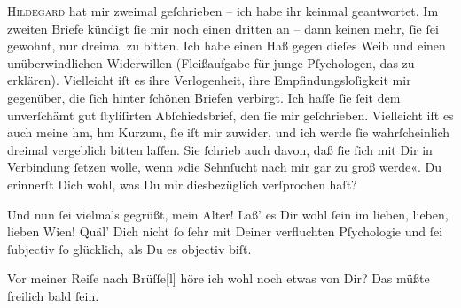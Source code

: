 \pstart
           \textsc{Hildegard} hat mir zweimal geſchrieben –  ich habe
               ihr keinmal geantwortet. Im zweiten Briefe kündigt ſie mir noch einen dritten an –
               dann keinen mehr, ſie ſei gewohnt, nur dreimal zu bitten. Ich habe einen Haß gegen
               dieſes Weib und einen
               unüberwindlichen Widerwillen (Fleißaufgabe für junge Pſychologen, das zu erklären).
                  {\pb}Vielleicht iſt es ihre Verlogenheit, ihre
               Empfindungsloſigkeit mir gegenüber, die ſich hinter ſchönen Briefen verbirgt. Ich
               haſſe ſie ſeit dem unverſchämt gut ſ\textcolor{gray}{t}yliſirten Abſchiedsbrief, den
               ſie mir geſchrieben. Vielleicht iſt es auch meine {\dotsfour} hm, hm
                  {\dotsfour} Kurzum, ſie iſt mir zuwider, und ich werde ſie
               wahrſcheinlich dreimal vergeblich bitten laſſen. Sie ſchrieb auch davon, daß ſie ſich
               mit Dir in Verbindung ſetzen wolle, wenn »die Sehnſucht nach  mir gar zu groß werde«. Du erinnerſt Dich wohl, was Du mir diesbezüglich
               verſprochen haſt? {\dotsfour}\pend
           
\pstart
           Und nun ſei vielmals gegrüßt, mein Alter! Laß’ es Dir wohl ſein im lieben, lieben,
               lieben Wien! Quäl’ {\pb}Dich nicht ſo ſehr mit Deiner verfluchten
               Pſychologie und ſei ſubjectiv ſo glücklich, als Du es objectiv biſt.\pend
           
\pstart
           Vor meiner Reiſe nach Brüſſe{[}l{]} höre ich wohl noch etwas von Dir? Das müßte freilich bald ſein.\pend
           
